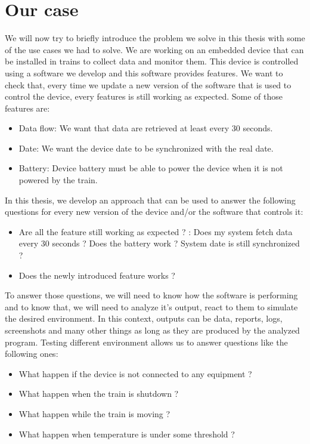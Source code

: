 \documentclass[12pt]{article}
\theoremstyle{definition}
\theoremstyle{definition}
\theoremstyle{remark}
\begin{document}

\section{Our case}
\label{section:ourcase}


We will now try to briefly introduce the problem we solve in this thesis with some of the use cases we had to solve. We are working on an embedded device that can be installed in trains to collect data and monitor them. This device is controlled using a software we develop and this software provides features. We want to check that, every time we update a new version of the software that is used to control the device, every features is still working as expected. Some of those features are:

\begin{itemize}
\item Data flow: We want that data are retrieved at least every 30 seconds.
\item Date: We want the device date to be synchronized with the real date.
\item Battery: Device battery must be able to power the device when it is not powered by the train.
\end{itemize}

In this thesis, we develop an approach that can be used to answer the following questions for every new version of the device and/or the software that controls it:
\begin{itemize}
\item \guillemotleft Are all the feature still working as expected ? \guillemotright: Does my system fetch data every 30 seconds ? Does the battery work ? System date is still synchronized ?
\item \guillemotleft Does the newly introduced feature works ? \guillemotright
\end{itemize}

To answer those questions, we will need to know how the software is performing and to know that, we will need to analyze it's output, react to them to simulate the desired environment. In this context, outputs can be data, reports, logs, screenshots and many other things as long as they are produced by the analyzed program. Testing different environment allows us to answer questions like the following ones:
\begin{itemize}
\item What happen if the device is not connected to any equipment ?
\item What happen when the train is shutdown ?
\item What happen while the train is moving ?
\item What happen when temperature is under some threshold ?
\end{itemize}
\end{document}
